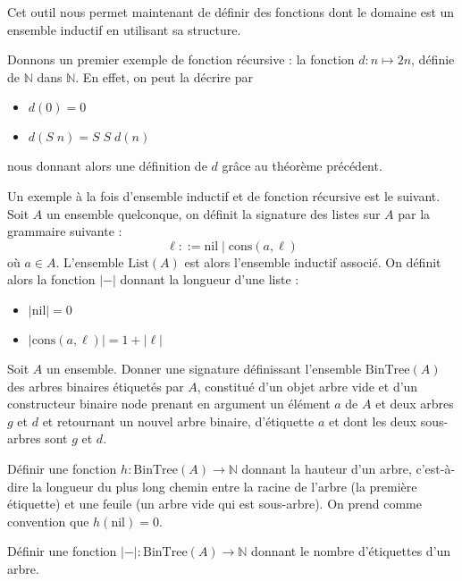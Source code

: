 Cet outil nous permet maintenant de définir des fonctions dont le domaine est
un ensemble inductif en utilisant sa structure.

\begin{example}
  Donnons un premier exemple de fonction récursive : la fonction
  $d :n\mapsto 2n$, définie de $\mathbb N$ dans $\mathbb N$. En effet, on peut
  la décrire par
  \begin{itemize}
  \item $d(0) = 0$
  \item $d(S\;n) = S\;S\;d(n)$
  \end{itemize}
  nous donnant alors une définition de $d$ grâce au théorème précédent.
\end{example}

\begin{example}
  Un exemple à la fois d'ensemble inductif et de fonction récursive est le
  suivant. Soit $A$ un ensemble quelconque, on définit la signature des listes
  sur $A$ par la grammaire suivante :
  $$\ell ::= \mathrm{nil}\mid \mathrm{cons}(a,\ell)$$
  où $a\in A$. L'ensemble $\mathrm{List}(A)$ est alors l'ensemble inductif
  associé. On définit alors la fonction $|-|$ donnant la longueur d'une
  liste :
  \begin{itemize}
  \item $|\mathrm{nil}| = 0$
  \item $|\mathrm{cons}(a,\ell)| = 1 + |\ell|$
  \end{itemize}
\end{example}

\begin{exercise}
  Soit $A$ un ensemble. Donner une signature définissant l'ensemble
  $\mathrm{BinTree}(A)$ des arbres
  binaires étiquetés par $A$, constitué d'un objet arbre vide et d'un
  constructeur binaire $\mathrm{node}$ prenant en argument un élément $a$ de $A$
  et deux arbres $g$ et $d$ et retournant un nouvel arbre binaire, d'étiquette
  $a$ et dont les deux sous-arbres sont $g$ et $d$.

  Définir une fonction $h : \mathrm{BinTree}(A) \to \mathbb N$ donnant la
  hauteur d'un arbre, c'est-à-dire la longueur du plus long chemin entre la
  racine de l'arbre (la première étiquette) et une feuile (un arbre vide qui est
  sous-arbre). On prend comme convention que $h(\mathrm{nil}) = 0$.

  Définir une fonction $|-| : \mathrm{BinTree}(A) \to \mathbb N$ donnant le
  nombre d'étiquettes d'un arbre.
\end{exercise}

